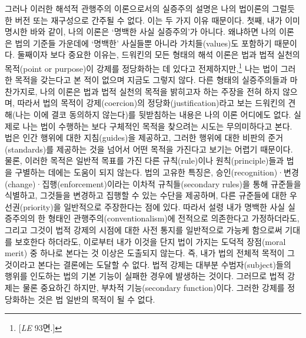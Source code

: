 그러나 이러한 해석적 관행주의 이론으로서의 실증주의 설명은 나의 법이론의
그럴듯한 버전 또는 재구성으로 간주될 수 없다. 이는 두 가지 이유
때문이다. 첫째, 내가 이미 명시한 바와 같이, 나의 이론은 `명백한 사실
실증주의'가 아니다. 왜냐하면 나의 이론은 법의 기준들 가운데에 `명백한'
사실들뿐 아니라 가치들(values)도 포함하기 때문이다. 둘째이자 보다 중요한
이유는, 드워킨의 모든 형태의 해석 이론은 법과 법적 실천의 목적(point or
purpose)이 강제를 정당화하는 데 있다고 전제하지만,\footnote{{[}\emph{LE}
  93면.{]}} 나는 법이 그러한 목적을 갖는다고 본 적이 없으며 지금도
그렇지 않다. 다른 형태의 실증주의들과 마찬가지로, 나의 이론은 법과 법적
실천의 목적을 밝히고자 하는 주장을 전혀 하지 않으며, 따라서 법의 목적이
강제(coercion)의 정당화(justification)라고 보는 드워킨의 견해(나는 이에
결코 동의하지 않는다)를 뒷받침하는 내용은 나의 이론 어디에도 없다.
실제로 나는 법이 수행하는 보다 구체적인 목적을 찾으려는 시도는
무의미하다고 본다. 법은 인간 행위에 대한 지침(guides)을 제공하고, 그러한
행위에 대한 비판의 준거(standards)를 제공하는 것을 넘어서 어떤 목적을
가진다고 보기는 어렵기 때문이다. 물론, 이러한 목적은 일반적 목표를 가진
다른 규칙(rule)이나 원칙(principle)들과 법을 구별하는 데에는 도움이 되지
않는다. 법의 고유한 특징은,
승인(recognition)·변경(change)·집행(enforcement)이라는 이차적
규칙들(secondary rules)을 통해 규준들을 식별하고, 그것들을 변경하고
집행할 수 있는 수단을 제공하며, 다른 규준들에 대한 우선권(priority)을
일반적으로 주장한다는 점에 있다. 따라서 설령 내가 명백한 사실 실증주의의
한 형태인 관행주의(conventionalism)에 전적으로 의존한다고 가정하더라도,
그리고 그것이 법적 강제의 시점에 대한 사전 통지를 일반적으로 가능케
함으로써 기대를 보호한다 하더라도, 이로부터 내가 이것을 단지 법이 가지는
도덕적 장점(moral merit) 중 하나로 본다는 것 이상은 도출되지 않는다. 즉,
내가 법의 전체적 목적이 그것이라고 본다는 결론에는 도달할 수 없다. 법적
강제는 대부분 수범자(subject)들의 행위를 인도하는 법의 기본 기능이
실패한 경우에 발생하는 것이다. 그러므로 법적 강제는 물론 중요하긴
하지만, 부차적 기능(secondary function)이다. 그러한 강제를 정당화하는
것은 법 일반의 목적이 될 수 없다.

